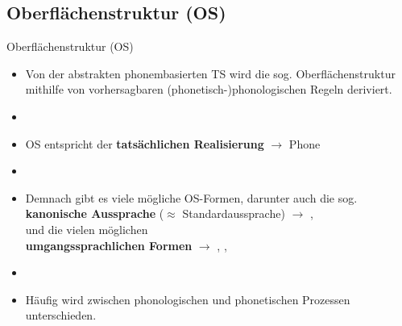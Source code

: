 %
\subsection{Oberflächenstruktur (OS)}
%

\begin{frame}{Oberflächenstruktur (OS)}

\begin{itemize}
	\item Von der abstrakten phonembasierten TS wird die sog. Oberflächenstruktur mithilfe von vorhersagbaren (phonetisch-)phonologischen Regeln deriviert.
	\item[]
	\item OS entspricht der \textbf{tatsächlichen Realisierung} $\rightarrow$ Phone \textipa{[ ]}
	\item[]
	\item Demnach gibt es viele mögliche OS-Formen, darunter auch die sog.\\ 
\textbf{kanonische Aussprache} ($\approx$ Standardaussprache) $\rightarrow$ \textipa{[P e: b @ n]},\\
und die vielen möglichen\\
\textbf{umgangssprachlichen Formen} $\rightarrow$ \textipa{[P e: b n]}, \textipa{[P e: b m]}, \textipa{[P e: m]}
	\item[]
	\item Häufig wird zwischen phonologischen und phonetischen Prozessen unterschieden.
\end{itemize}

\end{frame}




